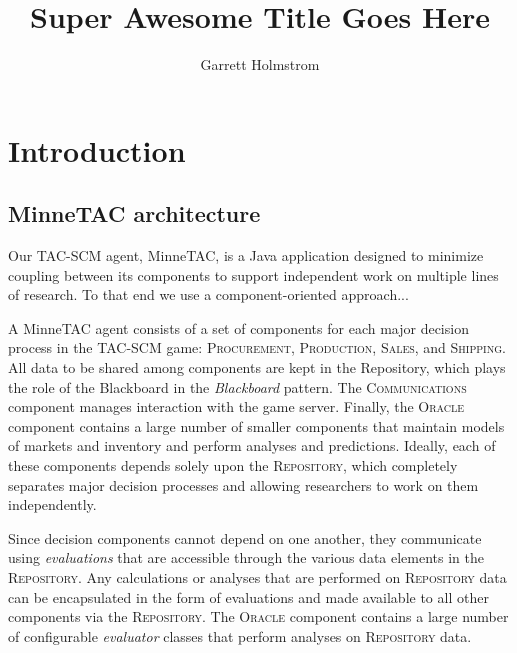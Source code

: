 \documentclass{elsart}
\begin{document}
\title{Super Awesome Title Goes Here}
\author[UMN]{Garrett Holmstrom}

\address[UMN]{Dept. of Computer Science and Engineering,
    University of Minnesota, 4-192 EE/CS Bldg., 200 Union St SE,
    Minneapolis, MN 55455, USA.}

\maketitle

\begin{abstract}

\end{abstract}

\section{Introduction}


\subsection{MinneTAC architecture}

Our TAC-SCM agent, MinneTAC, is a Java application designed to minimize
coupling between its components to support independent work on multiple
lines of research.  To that end we use a component-oriented approach...

A MinneTAC agent consists of a set of components for each major decision
process in the TAC-SCM game: \textsc{Procurement}, \textsc{Production},
\textsc{Sales}, and \textsc{Shipping}.  All data to be shared
among components are kept in the Repository, which plays the role
of the Blackboard in the \emph{Blackboard} pattern\cite{Busch96}.
The \textsc{Communications} component manages interaction with the game
server.  Finally, the \textsc{Oracle} component contains a large number
of smaller components that maintain models of markets and inventory and
perform analyses and predictions.  Ideally, each of these components
depends solely upon the \textsc{Repository}, which completely separates
major decision processes and allowing researchers to work on them
independently.


Since decision components cannot depend on one another, they communicate
using \emph{evaluations} that are accessible through the various data
elements in the \textsc{Repository}.  Any calculations or analyses that
are performed on \textsc{Repository} data can be encapsulated in the
form of evaluations and made available to all other components via the
\textsc{Repository}.  The \textsc{Oracle} component contains a large
number of configurable \emph{evaluator} classes that perform analyses
on \textsc{Repository} data.
\end{document}
